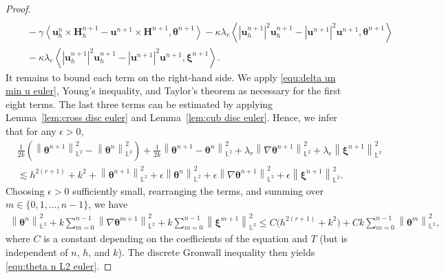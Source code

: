 \documentclass[11pt, reqno]{amsart}
\theoremstyle{definition}
\theoremstyle{remark}
\numberwithin{equation}{section}
\newcommand{\bff}{\boldsymbol}
\newcommand{\bb}{\mathbb}
\newcommand{\norm}[2]{\left\|{#1}\right\|_{#2}}
\newcommand{\inpro}[2]{\left\langle#1,#2\right\rangle}
\newcommand{\abs}[1]{\left|{#1}\right|}
\begin{document}
\begin{proof}
\begin{align*}
		\\
		&\quad 
		-
		\gamma \inpro{\bff{u}_h^n \times \bff{H}_h^{n+1} - \bff{u}^{n+1} \times \bff{H}^{n+1}}{\bff{\theta}^{n+1}}
		-
		\kappa \lambda_r \inpro{\abs{\bff{u}_h^{n+1}}^2 \bff{u}_h^{n+1} - \abs{\bff{u}^{n+1}}^2 \bff{u}^{n+1}}{\bff{\theta}^{n+1}}
		\\
		&\quad
		-
		\kappa \lambda_e \inpro{\abs{\bff{u}_h^{n+1}}^2 \bff{u}_h^{n+1} - \abs{\bff{u}^{n+1}}^2 \bff{u}^{n+1}}{\bff{\xi}^{n+1}}.
	\end{align*}
	It remains to bound each term on the right-hand side. We apply \eqref{equ:delta un min u euler}, Young's inequality, and Taylor's theorem as necessary for the first eight terms. The last three terms can be estimated by applying Lemma~\ref{lem:cross disc euler} and Lemma~\ref{lem:cub disc euler}. Hence, we infer that for any $\epsilon>0$,
	\begin{align*}
		&\frac{1}{2k} \left( \norm{\bff{\theta}^{n+1}}{\bb{L}^2}^2 - \norm{\bff{\theta}^n}{\bb{L}^2}^2 \right)
		+
		\frac{1}{2k} \norm{\bff{\theta}^{n+1}-\bff{\theta}^n}{\bb{L}^2}^2
		+
		\lambda_r \norm{\nabla \bff{\theta}^{n+1}}{\bb{L}^2}^2
		+
		\lambda_e \norm{\bff{\xi}^{n+1}}{\bb{L}^2}^2
		\\
		&\lesssim
		h^{2(r+1)}+k^2
		+
		\norm{\bff{\theta}^{n+1}}{\bb{L}^2}^2
		+
		\epsilon \norm{\bff{\theta}^n}{\bb{L}^2}^2
		+
		\epsilon \norm{\nabla \bff{\theta}^{n+1}}{\bb{L}^2}^2
		+
		\epsilon \norm{\bff{\xi}^{n+1}}{\bb{L}^2}^2.
	\end{align*}
	Choosing $\epsilon>0$ sufficiently small, rearranging the terms, and summing over $m\in \{0,1, \ldots, n-1\}$, we have
	\begin{align*}
		\norm{\bff{\theta}^n}{\bb{L}^2}^2
		+
		k \sum_{m=0}^{n-1} \norm{\nabla \bff{\theta}^{m+1}}{\bb{L}^2}^2
		+
		k \sum_{m=0}^{n-1} \norm{\bff{\xi}^{m+1}}{\bb{L}^2}^2
		\leq
		C \big(h^{2(r+1)} +k^2 \big)
		+
		Ck \sum_{m=0}^{n-1} \norm{\bff{\theta}^m}{\bb{L}^2}^2,
	\end{align*}
	where $C$ is a constant depending on the coefficients of the equation and $T$ (but is independent of $n$, $h$, and $k$). The discrete Gronwall inequality then yields \eqref{equ:theta n L2 euler}.
	

\end{proof}
\end{document}
